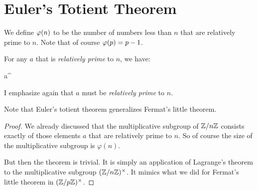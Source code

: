 \section{Euler's Totient Theorem}

\begin{definition}
  We define  $\varphi\mathopen{}\left( {n} \right)\mathclose{}$ to be the
  number of numbers less than $n$ that are relatively prime to $n$. Note
  that of course $\varphi\mathopen{}\left( {p} \right)\mathclose{} = p - 1$.
\end{definition}

\begin{theorem}
  For any $a$ that is \emph{relatively prime} to $n$, we have:

  \begin{nedqn}
    a^{}
   
  \end{nedqn}
\end{theorem}

\begin{remark}
  I emphasize again that $a$ must be \emph{relatively prime} to $n$.

  Note that Euler's totient theorem generalizes Fermat's little theorem.
\end{remark}

\begin{proof}
  We already discussed that the multiplicative subgroup of $\mathbb{Z} / n\mathbb{Z}$
  consists exactly of those elements $a$ that are relatively prime to
  $n$. So of course the size of the multiplicative subgroup is
  $\varphi(n)$.

  But then the theorem is trivial. It is simply an application of
  Lagrange's theorem to the multiplicative subgroup $\mathopen{}\left( {\mathbb{Z} / n\mathbb{Z}} \right)\mathclose{}^\times$. It mimics
  what we did for Fermat's little theorem in $\mathopen{}\left( {\mathbb{Z} / p\mathbb{Z}} \right)\mathclose{}^\times$.
\end{proof}

